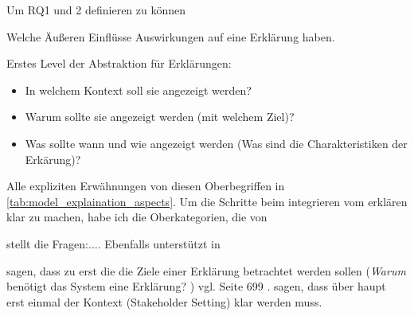 Um RQ1 und 2 definieren zu können

Welche Äußeren Einflüsse Auswirkungen auf eine Erklärung haben.

Erstes Level der Abstraktion für Erklärungen:

\begin{itemize}
    \item In welchem Kontext soll sie angezeigt werden? \cite{kohl_explainability_2019, chazette_knowledge_nodate}
    \item Warum sollte sie angezeigt werden (mit welchem Ziel)? \cite{kohl_explainability_2019, rosenfeld_explainability_2019}
    \item Was sollte wann und wie angezeigt werden (Was sind die Charakteristiken der Erkärung)? \cite{kohl_explainability_2019, rosenfeld_explainability_2019}
\end{itemize}

Alle expliziten Erwähnungen von diesen Oberbegriffen in \autoref{tab:model_explaination_aspects}. Um die Schritte beim integrieren vom erklären klar zu machen, habe ich die Oberkategorien, die von 

\cite{rosenfeld_explainability_2019} stellt die Fragen:.... Ebenfalls unterstützt in \cite{chazette2020explainability}

\cite{rosenfeld_explainability_2019} sagen, dass zu erst die die Ziele einer Erklärung betrachtet werden sollen (\glqq \textit{Warum} benötigt das System eine Erklärung? \grqq{}) vgl. Seite 699 \cite{rosenfeld_explainability_2019}. \cite{cirqueira_scenario-based_2020} sagen, dass über haupt erst einmal der Kontext (\glqq Stakeholder Setting\grqq{}) klar werden muss.

